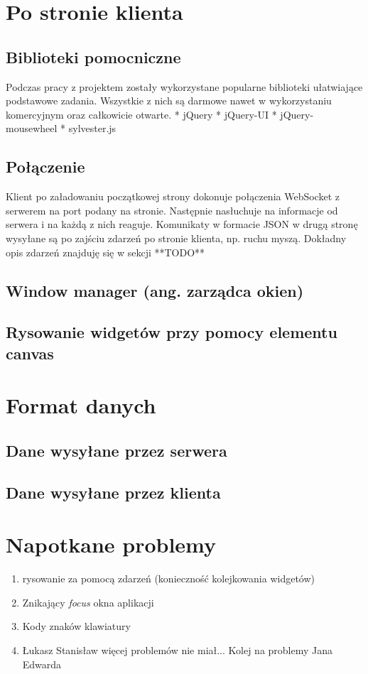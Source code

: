 \documentclass[polish]{inz}
\begin{document}
\section{Po stronie klienta}

\subsection{Biblioteki pomocniczne}
Podczas pracy z projektem zostały wykorzystane popularne biblioteki ułatwiające podstawowe zadania. Wszystkie z nich są darmowe nawet w wykorzystaniu komercyjnym oraz całkowicie otwarte.
* jQuery
* jQuery-UI
* jQuery-mousewheel
* sylvester.js

\subsection{Połączenie}
Klient po załadowaniu początkowej strony dokonuje połączenia WebSocket z serwerem na port podany na stronie. Następnie nasłuchuje na informacje od serwera i na każdą z nich reaguje. Komunikaty w formacie JSON w drugą stronę wysyłane są po zajściu zdarzeń po stronie klienta, np. ruchu myszą. Dokładny opis zdarzeń znajduję się w sekcji **TODO**

\subsection{Window manager (ang. zarządca okien)}


\subsection{Rysowanie widgetów przy pomocy elementu canvas}


\section{Format danych}

\subsection{Dane wysyłane przez serwera}

\subsection{Dane wysyłane przez klienta}

\section{Napotkane problemy}
\begin{enumerate}
  \item rysowanie za pomocą zdarzeń (konieczność kolejkowania widgetów)
  \item Znikający \emph{focus} okna aplikacji
  \label{problems_focus}
  \item Kody znaków klawiatury
  \label{problems_keyboard}
  \item Łukasz Stanisław więcej problemów nie miał... Kolej na problemy Jana Edwarda
\end{enumerate}
\end{document}
